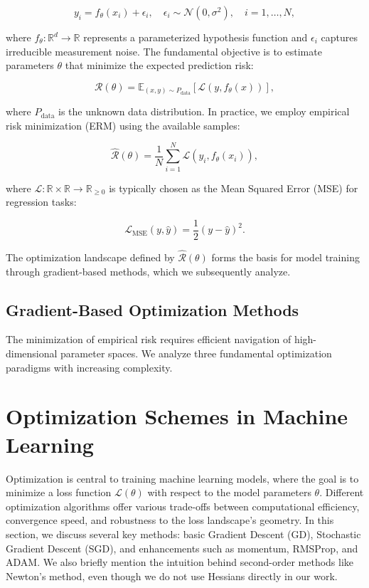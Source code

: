 \begin{equation}
y_i = f_\theta(x_i) + \epsilon_i, \quad \epsilon_i \sim \mathcal{N}(0, \sigma^2), \quad i=1,\ldots,N,
\label{eq:regression_model}
\end{equation}

where $f_\theta:\mathbb{R}^{d}\to\mathbb{R}$ represents a parameterized hypothesis function and $\epsilon_i$ captures irreducible measurement noise. The fundamental objective is to estimate parameters $\theta$ that minimize the expected prediction risk:

\begin{equation}
\mathcal{R}(\theta) = \mathbb{E}_{(x,y)\sim P_{\text{data}}} \left[\mathcal{L}\left(y, f_\theta(x)\right)\right],
\label{eq:true_risk}
\end{equation}

where $P_{\text{data}}$ is the unknown data distribution. In practice, we employ empirical risk minimization (ERM) using the available samples:

\begin{equation}
\hat{\mathcal{R}}(\theta) = \frac{1}{N}\sum_{i=1}^{N} \mathcal{L}\left(y_i, f_\theta(x_i)\right),
\label{eq:empirical_risk}
\end{equation}

where $\mathcal{L}:\mathbb{R}\times\mathbb{R}\to\mathbb{R}_{\ge 0}$ is typically chosen as the Mean Squared Error (MSE) for regression tasks:

\[
\mathcal{L}_{\text{MSE}}(y, \hat{y}) = \frac{1}{2}(y - \hat{y})^2.
\]

The optimization landscape defined by $\hat{\mathcal{R}}(\theta)$ forms the basis for model training through gradient-based methods, which we subsequently analyze.

\subsection{Gradient-Based Optimization Methods}
\label{subsec:optimization}

The minimization of empirical risk requires efficient navigation of high-dimensional parameter spaces. We analyze three fundamental optimization paradigms with increasing complexity.

\section{Optimization Schemes in Machine Learning}

Optimization is central to training machine learning models, where the goal is to minimize a loss function \( \mathcal{L}(\theta) \) with respect to the model parameters \(\theta\). Different optimization algorithms offer various trade-offs between computational efficiency, convergence speed, and robustness to the loss landscape’s geometry. In this section, we discuss several key methods: basic Gradient Descent (GD), Stochastic Gradient Descent (SGD), and enhancements such as momentum, RMSProp, and ADAM. We also briefly mention the intuition behind second-order methods like Newton's method, even though we do not use Hessians directly in our work.

